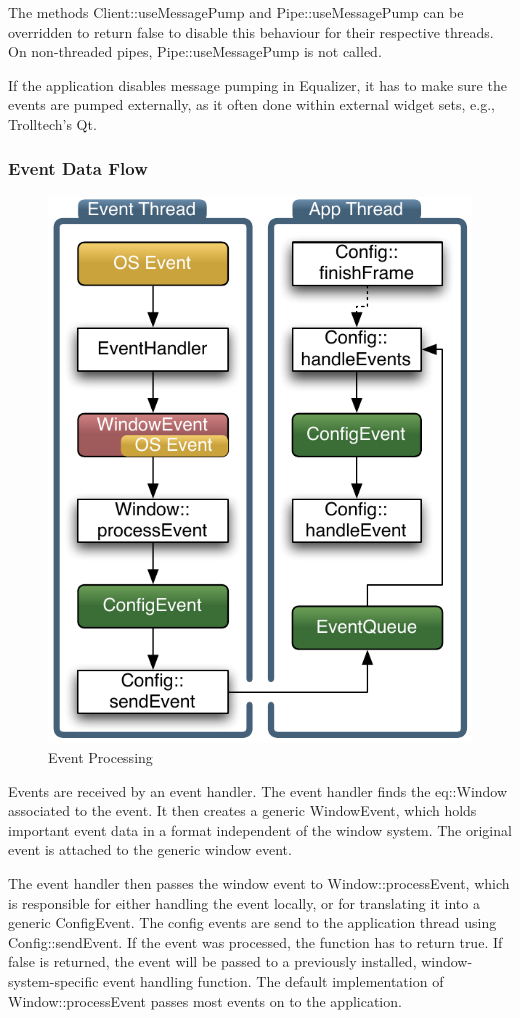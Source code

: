 \documentclass[10pt,a4]{scrartcl}
\begin{document}
The methods \textsf{Client::useMessagePump} and
\textsf{Pipe::useMessagePump} can be overridden to return \textsf{false}
to disable this behaviour for their respective threads. On non-threaded
pipes, \textsf{Pipe::useMessagePump} is not called.

If the application disables message pumping in Equalizer, it has to make
sure the events are pumped externally, as it often done within external
widget sets, e.g., Trolltech's Qt.


\subsubsection{Event Data Flow}

\begin{figure}
  \includegraphics[width=.4\textwidth]{images/eventFilter.pdf}
  {\caption{\small\label{fEventProcessing}Event Processing}}
\end{figure}
Events are received by an event handler. The event handler finds the
\textsf{eq::Window} associated to the event. It then creates a generic
\textsf{WindowEvent}, which holds important event data in a format
independent of the window system. The original event is attached to the
generic window event.

The event handler then passes the window event to
\textsf{Window::processEvent}, which is responsible for either handling
the event locally, or for translating it into a generic
\textsf{ConfigEvent}. The config events are send to the application
thread using \textsf{Config::sendEvent}. If the event was processed, the
function has to return \textsf{true}. If \textsf{false} is returned, the
event will be passed to a previously installed, window-system-specific
event handling function. The default implementation of
\textsf{Window::processEvent} passes most events on to the application.
\end{document}
